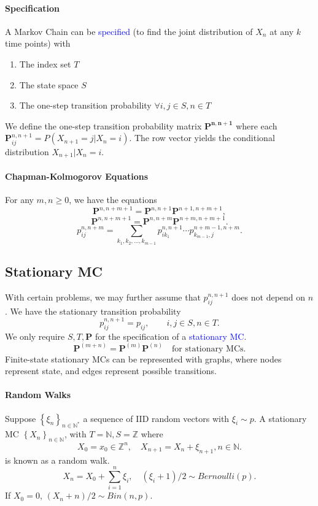 \paragraph{Specification}
A Markov Chain can be \textcolor{Blue}{specified} (to find the joint
distribution of $X_{n}$ at any $k$ time points) with
\begin{enumerate}
  \item The index set $T$
  \item The state space $S$ 
  \item The one-step transition probability $\forall i,j\in S,n\in T$ 
\end{enumerate}
We define the \textcolor{Bittersweet}{one-step transition probability matrix}
$\mathbf{P^{n,n+1}}$ where each $\mathbf{P}_{ij}^{n,n+1}=P\left(
X_{n+1}=j|X_{n}=i \right) $. The row vector yields the conditional distribution
$X_{n+1}|X_{n}=i$.
\paragraph{Chapman-Kolmogorov Equations}
For any $m,n\ge 0$, we have the equations
\[\mathbf{P}^{n,n+m+1}=\mathbf{P}^{n,n+1}\mathbf{P}^{n+1,n+m+1},\] 
\[\mathbf{P}^{n,n+m+1}=\mathbf{P}^{n,n+m}\mathbf{P}^{n+m,n+m+1}.\] 
\[p_{ij}^{n,n+m}=\sum_{k_1,k_2,\ldots,k_{m-1}} p_{ik_1}^{n,n+1}\cdots p_{k_{m-1},j}^{n+m-1,n+m}.\] 

\subsection{Stationary MC}
With certain problems, we may further assume that $p_{ij}^{n,n+1}$ does not
depend on $n$.  We have the \textcolor{Bittersweet}{stationary transition
probability}
\[p_{ij}^{n,n+1}=p_{ij},\qquad i,j\in S,n\in T.\]
We only require $S, T, \mathbf{P}$ for the specification of a
\textcolor{Blue}{stationary MC}.
\[\mathbf{P}^{(m+n)} = \mathbf{P}^{(m)}\mathbf{P}^{(n)}\quad\text{for
stationary MCs}.\] 
Finite-state stationary MCs can be represented with
\textcolor{Bittersweet}{graphs}, where nodes represent state, and edges
represent possible transitions.

\paragraph{Random Walks}
Suppose $\left\{ \xi_{n} \right\}_{n\in \mathbb{N^{*}}}$ a sequence of IID
random vectors with $\xi_{i}\sim p$. A stationary MC $\left\{
X_{n} \right\}_{n\in \mathbb{N}}$, with $T=\mathbb{N}, S=\mathbb{Z}$ where
\[X_0=x_0\in \mathbb{Z}^{n},\quad X_{n+1}=X_{n}+\xi_{n+1},n\in \mathbb{N}.\]
is known as a \textcolor{Bittersweet}{random walk}.
\[X_{n}=X_0+\sum_{i=1}^{n} \xi_i,\quad \left( \xi_i+1 \right) /2\sim Bernoulli(p).\] 
If $X_0=0$, $\left( X_{n}+n \right) /2\sim Bin(n,p)$.

